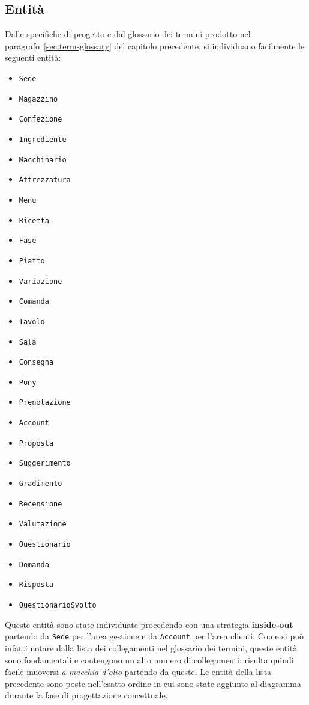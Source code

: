 \subsection{Entità}
Dalle specifiche di progetto e dal glossario dei termini prodotto nel
paragrafo~\ref{sec:termsglossary} del capitolo precedente, si individuano facilmente
le seguenti entità:
\begin{multicols}{3}
\begin{itemize}
    \item\tt Sede
    \item\tt Magazzino
    \item\tt Confezione
    \item\tt Ingrediente
    \item\tt Macchinario
    \item\tt Attrezzatura
    \item\tt Menu
    \item\tt Ricetta
    \item\tt Fase
    \item\tt Piatto
    \item\tt Variazione
    \item\tt Comanda
    \item\tt Tavolo
    \item\tt Sala
    \item\tt Consegna
    \item\tt Pony
    \item\tt Prenotazione
\end{itemize}
\begin{itemize}
    \item\tt Account
    \item\tt Proposta
    \item\tt Suggerimento
    \item\tt Gradimento
    \item\tt Recensione
    \item\tt Valutazione
    \item\tt Questionario
    \item\tt Domanda
    \item\tt Risposta
    \item\tt QuestionarioSvolto
\end{itemize}
\end{multicols}
Queste entità sono state individuate procedendo con una strategia {\bf inside-out}
partendo da {\tt Sede} per l'area gestione e da {\tt Account} per l'area clienti. Come
si può infatti notare dalla lista dei collegamenti nel glossario dei termini, queste
entità sono fondamentali e contengono un alto numero di collegamenti: risulta quindi
facile muoversi {\it a macchia d'olio} partendo da queste.
Le entità della lista precedente sono poste nell'esatto ordine in cui sono state
aggiunte al diagramma durante la fase di progettazione concettuale.
